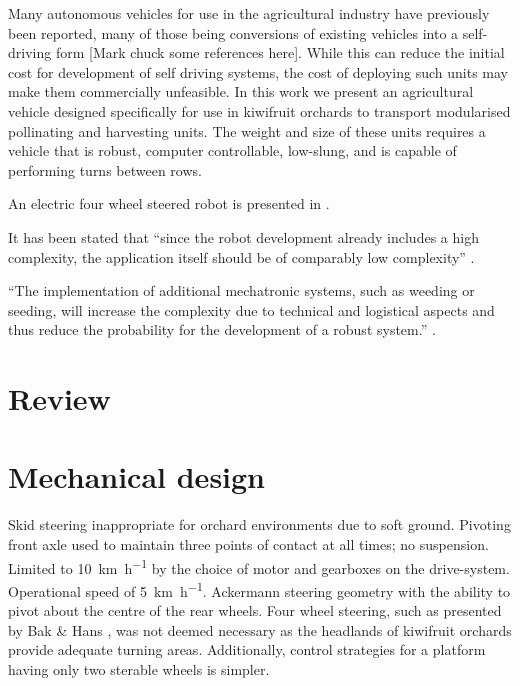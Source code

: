 \documentclass[preprint,authoryear,12pt]{elsarticle}
\begin{document}
Many autonomous vehicles for use in the agricultural industry have previously been reported, many of those being conversions of existing vehicles into a self-driving form [Mark chuck some references here].
While this can reduce the initial cost for development of self driving systems, the cost of deploying such units may make them commercially unfeasible.
In this work we present an agricultural vehicle designed specifically for use in kiwifruit orchards to transport modularised pollinating and harvesting units.
The weight and size of these units requires a vehicle that is robust, computer controllable, low-slung, and is capable of performing turns between rows.


An electric four wheel steered robot is presented in \cite{Bak2004}.

It has been stated that ``since the robot development already includes a high complexity, the application itself should be of comparably low complexity'' \citep{Ruckelshausen2009}.

``The implementation of additional mechatronic systems, such as weeding or seeding, will increase the complexity due to technical and logistical aspects and thus reduce the probability for the development of a robust system.'' \citep{Ruckelshausen2009}.


\section{Review}

\section{Mechanical design}
\label{sect:mechanical}
Skid steering inappropriate for orchard environments due to soft ground.
Pivoting front axle used to maintain three points of contact at all times; no suspension.
Limited to \SI{10}{\kilo\meter\per\hour} by the choice of motor and gearboxes on the drive-system.
Operational speed of \SI{5}{\kilo\meter\per\hour}.
Ackermann steering geometry with the ability to pivot about the centre of the rear wheels.
Four wheel steering, such as presented by Bak \& Hans \citep{Bak2004}, was not deemed necessary as the headlands of kiwifruit orchards provide adequate turning areas.
Additionally, control strategies for a platform having only two sterable wheels is simpler.
\end{document}
